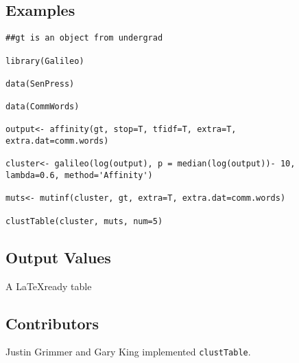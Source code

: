 \documentclass[12pt,letterpaper]{article}
\begin{document}
\subsection*{Examples}
\begin{verbatim}
##gt is an object from undergrad

library(Galileo)

data(SenPress)

data(CommWords)

output<- affinity(gt, stop=T, tfidf=T, extra=T,
extra.dat=comm.words)

cluster<- galileo(log(output), p = median(log(output))- 10,
lambda=0.6, method='Affinity')

muts<- mutinf(cluster, gt, extra=T, extra.dat=comm.words)

clustTable(cluster, muts, num=5)

\end{verbatim}

\subsection*{Output Values} A \LaTeX ready table

\subsection*{Contributors} Justin Grimmer and Gary King implemented
{\tt clustTable}.
\end{document}
